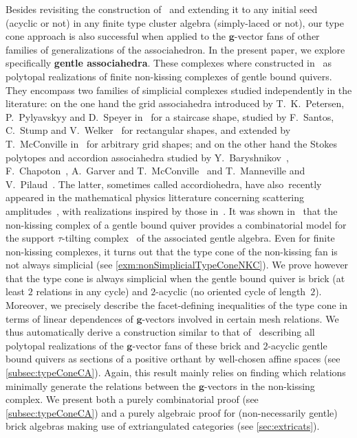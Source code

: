 \documentclass{amsart}
\theoremstyle{definition}
\renewcommand{\b}[1]{{\boldsymbol{#1}}} %
\begin{document}
\medskip
\enlargethispage{.4cm}
Besides revisiting the construction of~\cite{ArkaniHamedBaiHeYan, BazierMatteDouvilleMousavandThomasYildirim} and extending it to any initial seed (acyclic or not) in any finite type cluster algebra (simply-laced or not), our type cone approach is also successful when applied to the $\b{g}$-vector fans of other families of generalizations of the associahedron.
In the present paper, we explore specifically \textbf{gentle associahedra}. These complexes where constructed in~\cite{PaluPilaudPlamondon-nonkissing} as polytopal realizations of finite non-kissing complexes of gentle bound quivers. They encompass two families of simplicial complexes studied independently in the literature: on the one hand the grid associahedra introduced by T.~K.~Petersen, P.~Pylyavskyy and D.~Speyer in~\cite{PetersenPylyavskyySpeyer} for a staircase shape, studied by F.~Santos, C.~Stump and V.~Welker~\cite{SantosStumpWelker} for rectangular shapes, and extended by T.~McConville in~\cite{McConville} for arbitrary grid shapes; and on the other hand the Stokes polytopes and accordion associahedra studied by Y.~Baryshnikov~\cite{Baryshnikov}, F.~Chapoton~\cite{Chapoton-quadrangulations}, A.~Garver and T.~McConville~\cite{GarverMcConville} and T.~Manneville and V.~Pilaud~\cite{MannevillePilaud-accordion}. The latter, sometimes called accordiohedra, have also~recently appeared in the mathematical physics litterature concerning scattering amplitudes~\cite{BanerjeeLaddhaRaman, Raman}, with realizations inspired by those in~\cite{ArkaniHamedBaiHeYan}. It was shown in~\cite{PaluPilaudPlamondon-nonkissing, BrustleDouvilleMousavandThomasYildirim} that the non-kissing complex of a gentle bound quiver provides a combinatorial model for the support $\tau$-tilting complex~\cite{AdachiIyamaReiten} of the associated gentle algebra. Even for finite non-kissing complexes, it turns out that the type cone of the non-kissing fan is not always simplicial (see \cref{exm:nonSimplicialTypeConeNKC}). We prove however that the type cone is always simplicial when the gentle bound quiver is brick (at least $2$ relations in any cycle) and $2$-acyclic (no oriented cycle of length~$2$). Moreover, we precisely describe the facet-defining inequalities of the type cone in terms of linear dependences of $\b{g}$-vectors involved in certain mesh relations. We thus automatically derive a construction similar to that of~\cite{ArkaniHamedBaiHeYan, BazierMatteDouvilleMousavandThomasYildirim} describing all polytopal realizations of the $\b{g}$-vector fans of these brick and $2$-acyclic gentle bound quivers as sections of a positive orthant by well-chosen affine spaces (see \cref{subsec:typeConeCA}). Again, this result mainly relies on finding which relations minimally generate the relations between the $\b{g}$-vectors in the non-kissing complex. We present both a purely combinatorial proof (see \cref{subsec:typeConeCA}) and a purely algebraic proof for (non-necessarily gentle) brick algebras making use of extriangulated categories (see \cref{sec:extricats}).
\end{document}
